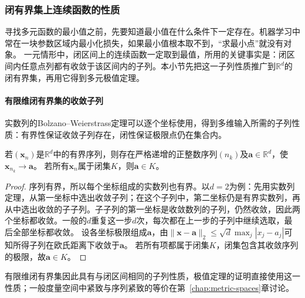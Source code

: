 \subsubsection{闭有界集上连续函数的性质}

寻找多元函数的最小值之前，先要知道最小值在什么条件下一定存在。机器学习中常在一块参数区域内最小化损失，如果最小值根本取不到，“求最小点”就没有对象。
一元情形中，闭区间上的连续函数一定取到最值，所用的关键事实是：闭区间内任意点列都有收敛于该区间内的子列。本小节先把这一子列性质推广到$\mathbb R^d$的闭有界集，再用它得到多元极值定理。

\paragraph{有限维闭有界集的收敛子列}
实数列的Bolzano--Weierstrass定理可以逐个坐标使用，得到多维输入所需的子列性质：有界性保证收敛子列存在，闭性保证极限点仍在集合内。
\begin{theorem}[有限维有界序列的收敛子列]
\label{thm:multivariable-bolzano-weierstrass}
若$(\bm x_n)$是$\mathbb R^d$中的有界序列，则存在严格递增的正整数序列$(n_k)$及$\bm a\in\mathbb R^d$，使$\bm x_{n_k}\to\bm a$。
若所有$\bm x_n$属于闭集$K$，则$\bm a\in K$。
\end{theorem}
\begin{proof}
序列有界，所以每个坐标组成的实数列也有界。以$d=2$为例：先用实数列定理，从第一坐标中选出收敛子列；在这个子列中，第二坐标仍是有界实数列，再从中选出收敛的子子列。子子列的第一坐标是收敛数列的子列，仍然收敛，因此两个坐标都收敛。一般的$d$重复这一步$d$次，每次都在上一步的子列中继续选取，最后全部坐标都收敛。
设各坐标极限组成$\bm a$，由$\lVert\bm x-\bm a\rVert_2\leq\sqrt d\max_j|x_j-a_j|$可知所得子列在欧氏距离下收敛于$\bm a$。
若所有项都属于闭集$K$，闭集包含其收敛序列的极限，故$\bm a\in K$。
\end{proof}
有限维闭有界集因此具有与闭区间相同的子列性质，极值定理的证明直接使用这一性质；一般度量空间中紧致与序列紧致的等价在第~\ref{chap:metric-spaces}章讨论。

